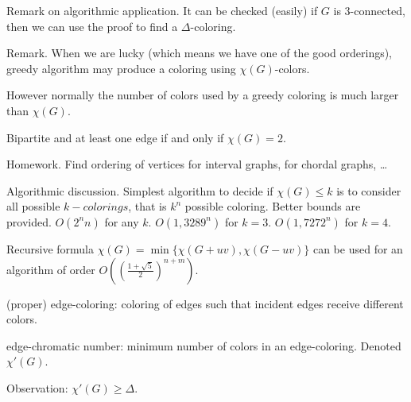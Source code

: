 \documentclass[12pt,a4paper]{article} \usepackage{fontspec}
\begin{document}
Remark on algorithmic application. It can be checked (easily) if \(G\) is
3-connected, then we can use the proof to find a \(\Delta\)-coloring.

Remark. When we are lucky (which means we have one of the good orderings),
greedy algorithm may produce a coloring using \(\chi(G)\)-colors.

However normally the number of colors used by a greedy coloring is much larger
than \(\chi(G)\).

Bipartite and at least one edge if and only if \(\chi(G)=2\).

\begin{center}  \end{center}

Homework. Find ordering of vertices for interval graphs, for chordal graphs, …

Algorithmic discussion.  Simplest algorithm to decide if \(\chi(G) \leq k\) is
to consider all possible \(k-colorings\), that is \(k^n\) possible coloring.
Better bounds are provided. \(O(2^n n)\) for any \(k\). \(O(1,3289^n)\) for
\(k=3\). \(O(1,7272^n)\) for \(k=4\).

Recursive formula \(\chi(G)=\min\{\chi(G+uv), \chi(G-uv)\}\) can be used for an
algorithm of order \(O\left({\left(\frac{1+\sqrt{5}}{2}\right)}^{n+m}\right)\).

(proper) edge-coloring: coloring of edges such that incident edges receive
different colors.

edge-chromatic number: minimum number of colors in an edge-coloring. Denoted
\(\chi'(G)\).

Observation: \(\chi'(G) \geq \Delta\).
\end{document}
